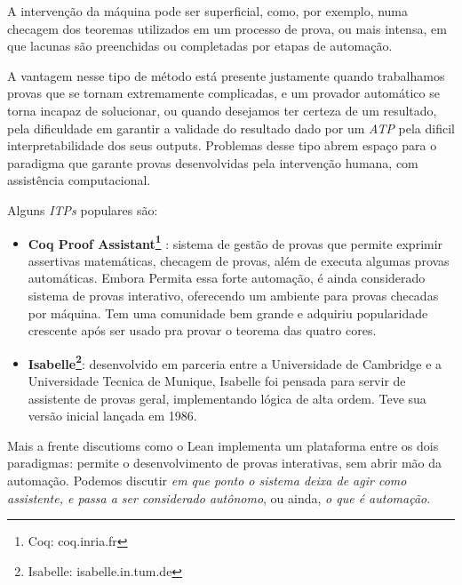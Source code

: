A intervenção da máquina pode ser superficial, como, por exemplo, numa checagem dos teoremas utilizados em um processo de prova, ou mais intensa, em que lacunas são preenchidas ou completadas por etapas de automação.

A vantagem nesse tipo de método está presente justamente quando trabalhamos provas que se tornam extremamente complicadas, e um provador automático se torna incapaz de solucionar, ou quando desejamos ter certeza de um resultado, pela dificuldade em garantir a validade do resultado dado por um \textit{ATP} pela dificil interpretabilidade dos seus outputs.
Problemas desse tipo abrem espaço para o paradigma que garante provas desenvolvidas pela intervenção humana, com assistência computacional.

Alguns \textit{ITPs} populares são:
\begin{itemize}
    \item \textbf{Coq Proof Assistant\footnote{Coq: coq.inria.fr}} : sistema de gestão de provas que permite exprimir assertivas matemáticas, checagem de provas, além de executa algumas provas automáticas. Embora Permita essa forte automação, é ainda considerado sistema de provas interativo, oferecendo um ambiente para provas checadas por máquina. Tem uma comunidade bem grande e adquiriu popularidade crescente após ser usado pra provar o teorema das quatro cores.

    \item \textbf{Isabelle\footnote{Isabelle: isabelle.in.tum.de}}: desenvolvido em parceria entre a Universidade de Cambridge e a Universidade Tecnica de Munique, Isabelle foi pensada para servir de assistente de provas geral, implementando lógica de alta ordem. Teve sua versão inicial lançada em 1986.
\end{itemize}

Mais a frente discutioms como o Lean implementa um plataforma entre os dois paradigmas: permite o desenvolvimento de provas interativas, sem abrir mão da automação.
Podemos discutir \textit{em que ponto o sistema deixa de agir como assistente, e passa a ser considerado autônomo}, ou ainda, \textit{o que é automação}.



